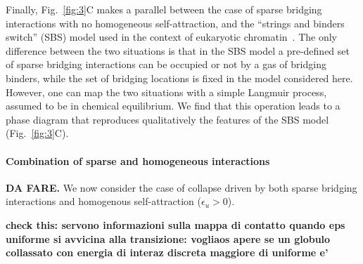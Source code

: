 \documentclass[a4paper,12pt,pre,superscriptaddress]{revtex4}
\begin{document}

Finally, Fig.~\ref{fig:3}C makes a parallel between the case of
sparse bridging interactions with no homogeneous self-attraction, and
the ``strings and binders switch'' (SBS) model used in the context of
eukaryotic chromatin~\cite{Barbieri2012,Barbieri2013b}.
The only difference between the two situations is that in the SBS
model a pre-defined set of sparse bridging interactions can be
occupied or not by a gas of bridging binders, while the set of
bridging locations is fixed in the model considered here. However, one
can map the two situations with a simple Langmuir process, assumed to
be in chemical equilibrium. We find that this operation leads to a
phase diagram that reproduces qualitatively the features of the SBS
model (Fig.~\ref{fig:3}C).



\paragraph*{Combination of sparse and homogeneous interactions} 


\textbf{DA FARE.} We now consider the case of collapse driven by both
sparse bridging interactions and homogenous self-attraction
($\epsilon_u > 0$).



\cite{Dasmahapatra2006}


\textbf{check this: servono  informazioni sulla mappa di contatto
  quando eps uniforme si avvicina alla transizione: vogliaos apere se
  un globulo collassato con energia di interaz discreta maggiore di
  uniforme e'  }
\end{document}
